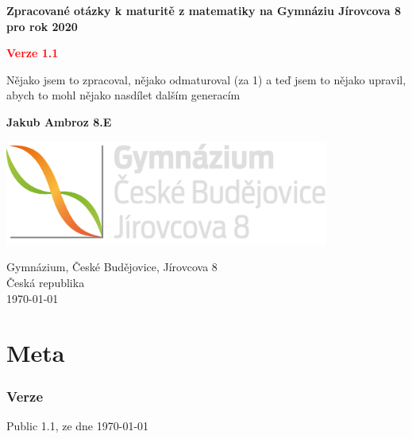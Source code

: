 \documentclass[12pt]{article}
\begin{document}
\begin{titlepage}
   \begin{center}
       \vspace*{1cm}

		\begin{Huge}
		 \textbf{Zpracované otázky k maturitě z matematiky na Gymnáziu Jírovcova 8 pro rok 2020}\\
		\end{Huge}
		\vspace{0.5cm}
		\begin{LARGE}
		\textbf{\textcolor{red}{Verze 1.1}}
		\end{LARGE}


       \vspace{0.5cm}
       Nějako jsem to zpracoval, nějako odmaturoval (za 1) a teď jsem to nějako upravil, abych to mohl nějako nasdílet dalším generacím

       \vspace{1.5cm}
		\begin{LARGE}
		\textbf{Jakub Ambroz 8.E}
		\end{LARGE}


       \vfill


       \vspace{0.8cm}

       \includegraphics[width=0.8\textwidth]{logo-src.png}

       Gymnázium, České Budějovice, Jírovcova 8\\
       Česká republika\\
       \today

   \end{center}
\end{titlepage}

\section*{Meta}
\subsubsection{Verze}
Public 1.1, ze dne \today
\end{document}
